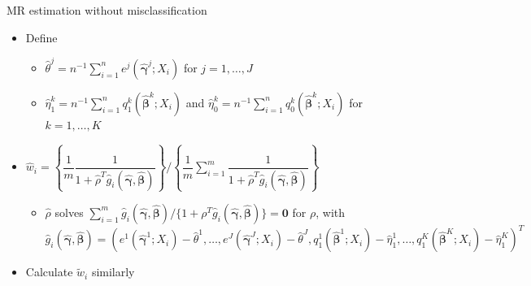 \documentclass[12pt,aspectratio=169]{beamer}
\begin{document}
\begin{frame}{MR estimation without misclassification}
\begin{itemize}



\item Define 

\begin{itemize}
\item

$\hat\theta^j=n^{-1}\sum_{i=1}^n e^j(\hat{\boldsymbol\gamma}^j; X_i)$ for $j=1,\ldots,J$

 \item  $\hat\eta_1^k=n^{-1}\sum_{i=1}^n q_1^k(\hat{\boldsymbol\beta}^k; X_i)$ and $\hat\eta_0^k=n^{-1}\sum_{i=1}^n q_0^k(\hat{\boldsymbol\beta}^k; X_i)$ for $k=1,\ldots,K$ 


\end{itemize}



\item
$
\hat w_i=\left\{\dfrac{1}{m}\dfrac{1}{1+\hat\rho^T \hat g_i(\hat{\boldsymbol\gamma},\hat{\boldsymbol\beta}) }\right\}\bigg/\left\{\dfrac{1}{m}\sum_{i=1}^m\dfrac{1}{1+\hat\rho^T \hat g_i(\hat{\boldsymbol\gamma},\hat{\boldsymbol\beta}) }\right\}
$

\begin{itemize}

\item  $\hat\rho$ solves $\sum_{i=1}^m{\hat g_i(\hat{\boldsymbol\gamma},\hat{\boldsymbol\beta})}/\{1+\rho^T  \hat g_i(\hat{\boldsymbol\gamma},\hat{\boldsymbol\beta})\}=\boldsymbol 0$ for $\rho$, with
{\small
$
\hat g_i(\hat{\boldsymbol\gamma},\hat{\boldsymbol\beta})=(e^1(\hat{\boldsymbol\gamma}^1; X_i)-\hat\theta^1,\ldots, e^J(\hat{\boldsymbol\gamma}^J; X_i)-\hat\theta^J, q_1^1(\hat{\boldsymbol\beta}^1; X_i)-\hat\eta_1^1,\ldots, q_1^K(\hat{\boldsymbol\beta}^K; X_i)-\hat\eta_1^K)^T 
$ 
}
\end{itemize}


\bigskip
\item Calculate $\tilde w_i$ similarly

\end{itemize}

\end{frame}
\end{document}
